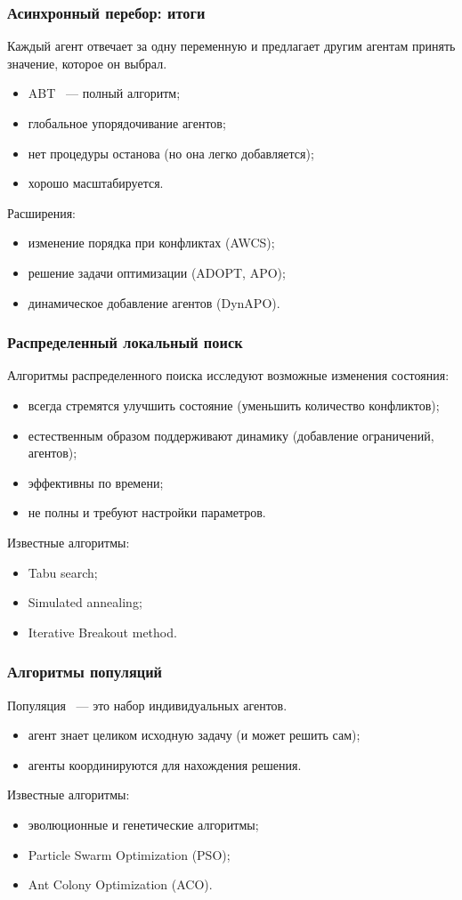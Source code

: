 \documentclass{beamer}
\begin{document}
\begin{frame}
  \frametitle{Асинхронный перебор: итоги}
  Каждый агент отвечает за одну переменную и предлагает другим агентам принять значение,
  которое он выбрал.
  \begin{itemize}
    \item ABT ~--- полный алгоритм;
    \item глобальное упорядочивание агентов;
    \item нет процедуры останова (но она легко добавляется);
    \item хорошо масштабируется.
  \end{itemize}

  Расширения:
  \begin{itemize}
    \item изменение порядка при конфликтах (AWCS);
    \item решение задачи оптимизации (ADOPT, APO);
    \item динамическое добавление агентов (DynAPO).
  \end{itemize}
\end{frame}

\begin{frame}
  \frametitle{Распределенный локальный поиск}
  Алгоритмы распределенного поиска исследуют возможные изменения состояния:
  \begin{itemize}
    \item всегда стремятся улучшить состояние (уменьшить количество конфликтов);
    \item естественным образом поддерживают динамику (добавление ограничений, агентов);
    \item эффективны по времени;
    \item не полны и требуют настройки параметров.
  \end{itemize}

  Известные алгоритмы:
  \begin{itemize}
    \item Tabu search;
    \item Simulated annealing;
    \item Iterative Breakout method.
  \end{itemize}
\end{frame}

\begin{frame}
  \frametitle{Алгоритмы популяций}
  Популяция ~--- это набор индивидуальных агентов.
  \begin{itemize}
    \item агент знает целиком исходную задачу (и может решить сам);
    \item агенты координируются для нахождения решения.
  \end{itemize}

  Известные алгоритмы:
  \begin{itemize}
    \item эволюционные и генетические алгоритмы;
    \item Particle Swarm Optimization (PSO);
    \item Ant Colony Optimization (ACO).
  \end{itemize}
\end{frame}
\end{document}
